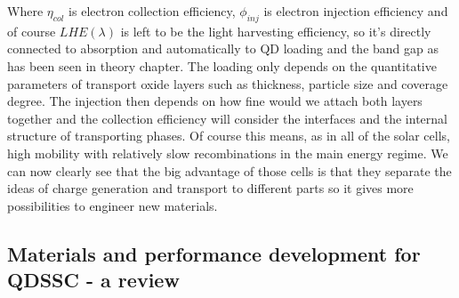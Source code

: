 Where $\eta_{col}$ is electron collection efficiency, $\phi_{inj}$ is electron injection efficiency and of course $LHE(\lambda )$ is left to be the light harvesting efficiency, so it's directly connected to absorption and automatically to QD loading and the band gap as has been seen in theory chapter. The loading only depends on the quantitative parameters of transport oxide layers such as thickness, particle size and coverage degree. The injection then depends on how fine would we attach both layers together and the collection efficiency will consider the interfaces and the internal structure of transporting phases. Of course this means, as in all of the solar cells, high mobility with relatively slow recombinations in the main energy regime. We can now clearly see that the big advantage of those cells is that they separate the ideas of charge generation and transport to different parts so it gives more possibilities to engineer new materials. 
\cite{HuashangRao2018} \cite{Wu2014}

\subsection{Materials and performance development for QDSSC - a review}

